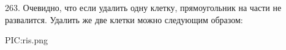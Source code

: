 263. Очевидно, что если удалить одну клетку, прямоугольник на части не развалится. Удалить же две клетки можно следующим образом:
\begin{center}
{{PIC:ris.png}}
\end{center}
